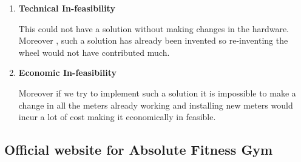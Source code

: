 \documentclass[fleqn,10pt]{../SelfArx} %
\begin{document}
\begin{enumerate}
\item \textbf{Technical In-feasibility}

This could not have a solution without making changes in the hardware. Moreover , such a solution has already been invented so re-inventing the wheel would not have contributed much.

\item \textbf{Economic In-feasibility}


Moreover if we try to implement such a solution it is  impossible to make a change in all the meters already working and installing new meters would incur a lot of cost making it economically in feasible.
\end{enumerate}

\subsection {Official website for Absolute Fitness Gym}
\end{document}
